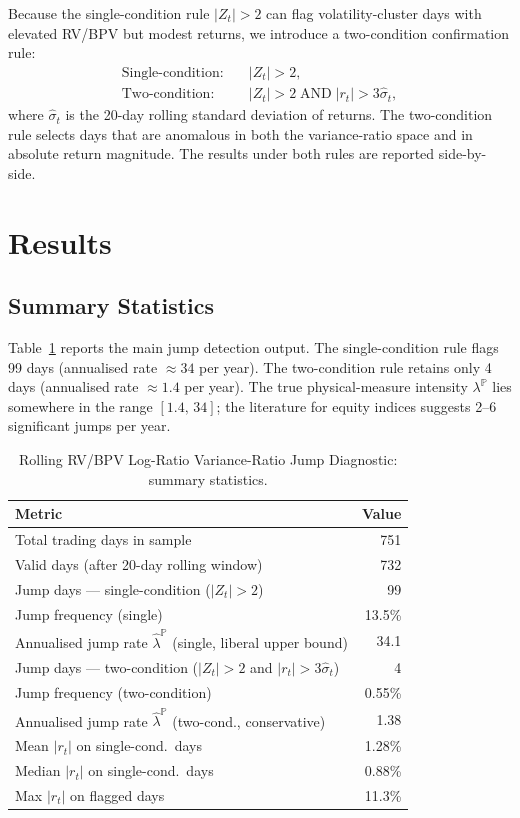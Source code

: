 \documentclass[11pt,a4paper]{article}
\begin{document}
Because the single-condition rule $|Z_t|>2$ can flag volatility-cluster days with elevated RV/BPV but modest returns, we introduce a two-condition confirmation rule:
\begin{align}
\text{Single-condition:} &\quad |Z_t|>2, \label{eq:single} \\
\text{Two-condition:} &\quad |Z_t|>2 \;\text{AND}\; |r_t|>3\hat{\sigma}_t, \label{eq:two}
\end{align}
where $\hat{\sigma}_t$ is the 20-day rolling standard deviation of returns. The two-condition rule selects days that are anomalous in both the variance-ratio space and in absolute return magnitude. The results under both rules are reported side-by-side.

\section{Results}

\subsection{Summary Statistics}

Table~\ref{tab:jump-summary} reports the main jump detection output. The single-condition rule flags 99 days (annualised rate $\approx 34$ per year). The two-condition rule retains only 4 days (annualised rate $\approx 1.4$ per year). The true physical-measure intensity $\lambda^{\mathbb{P}}$ lies somewhere in the range $[1.4,\,34]$; the literature for equity indices suggests 2--6 significant jumps per year.

\begin{table}[H]
\centering
\caption{Rolling RV/BPV Log-Ratio Variance-Ratio Jump Diagnostic: summary statistics.}
\label{tab:jump-summary}
\begin{tabular}{lr}
\toprule
Metric & Value \\
\midrule
Total trading days in sample & 751 \\
Valid days (after 20-day rolling window) & 732 \\
Jump days --- single-condition ($|Z_t|>2$) & 99 \\
Jump frequency (single) & 13.5\% \\
Annualised jump rate $\hat{\lambda}^{\mathbb{P}}$ (single, liberal upper bound) & 34.1 \\
Jump days --- two-condition ($|Z_t|>2$ and $|r_t|>3\hat{\sigma}_t$) & 4 \\
Jump frequency (two-condition) & 0.55\% \\
Annualised jump rate $\hat{\lambda}^{\mathbb{P}}$ (two-cond., conservative) & 1.38 \\
Mean $|r_t|$ on single-cond.\ days & 1.28\% \\
Median $|r_t|$ on single-cond.\ days & 0.88\% \\
Max $|r_t|$ on flagged days & 11.3\% \\
\bottomrule
\end{tabular}
\end{table}
\end{document}

